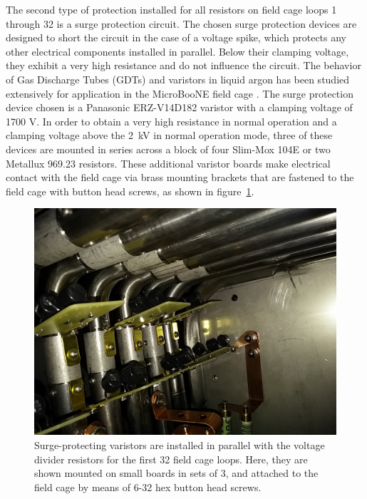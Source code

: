 The second type of protection installed for all resistors on field cage loops 1 through 32 is a surge protection circuit. The chosen surge protection devices are designed to short the circuit in the case of a voltage spike, which protects any other electrical components installed in parallel.  Below their clamping voltage, they exhibit a very high resistance and do not influence the circuit. The behavior of Gas Discharge Tubes (GDTs) and varistors in liquid argon has been studied extensively for application in the MicroBooNE field cage \cite{Asaadi:2014iva}. The surge protection device chosen is a Panasonic ERZ-V14D182 varistor with a clamping voltage of 1700 V. In order to obtain a very high resistance in normal operation and a clamping voltage above the 2~kV in normal operation mode, three of these devices are mounted in series across a block of four Slim-Mox 104E or two Metallux 969.23 resistors. These additional varistor boards make electrical contact with the field cage via brass mounting brackets that are fastened to the field cage with button head screws, as shown in figure~\ref{fig:tpc-voltage-divider-varistors}.

\begin{figure}[htb]
\centering	
\includegraphics[width=0.8\linewidth]{figures/tpc-voltage-divider-varistors.jpg}
\caption{Surge-protecting varistors are installed in parallel with the voltage divider resistors for the first 32 field cage loops. Here, they are shown mounted on small boards in sets of 3, and attached to the field cage by means of 6-32 hex button head screws.}
\label{fig:tpc-voltage-divider-varistors}
\end{figure}





